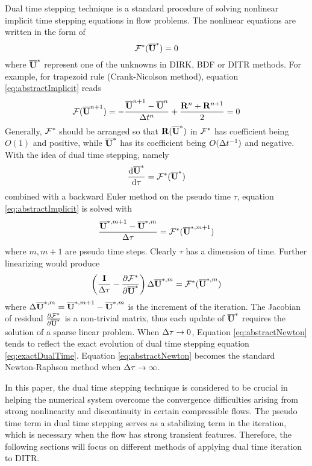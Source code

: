 Dual time stepping technique \cite{jameson1991time,jameson2017evaluation}
is a standard procedure of solving nonlinear
implicit time stepping equations
in flow problems.
The nonlinear equations are written in the form of
\begin{equation}
    \mathcal{F}^*(\overline{\mathbf{U}}^*) = 0
    \label{eq:abstractImplicit}
\end{equation}
where $\overline{\mathbf{U}}^*$ represent one of the unknowns
in DIRK, BDF or DITR methods.
For example, for trapezoid rule (Crank-Nicolson method),
equation \eqref{eq:abstractImplicit} reads
\begin{equation}
    \label{eq:trapF}
    \mathcal{F}(\overline{\mathbf{U}}^{n+1}) =
    -\frac{\overline{\mathbf{U}}^{n+1}-\overline{\mathbf{U}}^{n}}{{\Delta} t^n} + \frac{\mathbf{R}^{n} + \mathbf{R}^{n+1}}{2}
    =0
\end{equation}
Generally, $\mathcal{F}^*$ should be arranged so that
$\mathbf{R}(\overline{\mathbf{U}}^*)$ in $\mathcal{F}^*$ has coefficient being $O(1)$ and positive,
while $\overline{\mathbf{U}}^*$ has its coefficient being $O({\Delta} t^{-1})$ and negative.
With the idea of dual time stepping, namely
\begin{equation}
    \frac{\dd\overline{\mathbf{U}}^{*}}{\dd \tau} = \mathcal{F}^*(\overline{\mathbf{U}}^{*})
    \label{eq:exactDualTime}
\end{equation}
combined with a backward Euler method on the
pseudo time $\tau$, equation \eqref{eq:abstractImplicit}
is solved with
\begin{equation}
    \frac{\overline{\mathbf{U}}^{*,m+1} - \overline{\mathbf{U}}^{*,m}}{{\Delta} \tau} = \mathcal{F}^*(\overline{\mathbf{U}}^{*,m+1})
\end{equation}
where $m, m+1$ are pseudo time steps.
Clearly $\tau$ has a dimension of time.
Further linearizing would produce
\begin{equation}
    \left(\frac{\eye}{\inc\tau} -
    \partialderivative{\FF^*}{\uu^*}  \right)
    \inc\uu^{*,m} = \FF^*(\uu^{*,m})
    \label{eq:abstractNewton}
\end{equation}
where ${\Delta}\overline{\mathbf{U}}^{*,m} = \overline{\mathbf{U}}^{*,m+1} - \overline{\mathbf{U}}^{*,m}$ is the increment
of the iteration.
The Jacobian of residual $\partialderivative{\FF^*}{\uu^*}$
is a non-trivial matrix, thus each update of $\overline{\mathbf{U}}^*$ requires
the solution of a sparse linear problem.
When ${\Delta}\tau\rightarrow0$, Equation \eqref{eq:abstractNewton}
tends to reflect the exact evolution of dual time stepping
equation \eqref{eq:exactDualTime}.
Equation \eqref{eq:abstractNewton} becomes the
standard Newton-Raphson method when ${\Delta}\tau\rightarrow\infty$.

In this paper, the dual time stepping technique is considered to be crucial
in helping the numerical system overcome the convergence difficulties
arising from strong nonlinearity and discontinuity
in certain compressible flows.
The pseudo time term in dual time stepping
serves as a stabilizing term in the iteration,
which is necessary when the flow has strong transient features.
Therefore, the following sections will focus on different
methods of applying dual time iteration to DITR.

